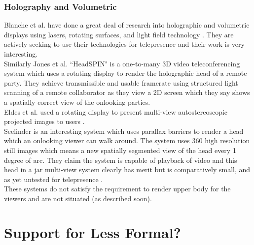 \subsubsection{Holography and Volumetric}
Blanche et al. have done a great deal of research into holographic and volumetric displays using lasers, rotating surfaces, and light field technology   \cite{Blanche2010,tay2008updatable}. They are actively seeking to use their technologies for telepresence and their work is very interesting.\\
Similarly Jones et al. ``HeadSPIN" is a one-to-many 3D video teleconferencing system \cite{jones2009headspin} which uses a rotating display to render the holographic head of a remote party. They achieve transmissible and usable framerate using structured light scanning of a remote collaborator as they view a 2D screen which they say shows a spatially correct view of the onlooking parties.\\
Eldes et al. used a rotating display to present multi-view autostereoscopic projected images to users \cite{eldes2013multi}.\\
Seelinder is an interesting system which uses parallax barriers to render a head which an onlooking viewer can walk around. The system uses 360 high resolution still images which means a new spatially segmented view of the head every 1 degree of arc. They claim the system is capable of playback of video and this head in a jar multi-view system clearly has merit but is comparatively small, and as yet untested for telepresence \cite{Yendo2010}.\\
These systems do not satisfy the requirement to render upper body for the viewers and are not situated (as described soon).\\

        \section{Support for Less Formal?}
        
